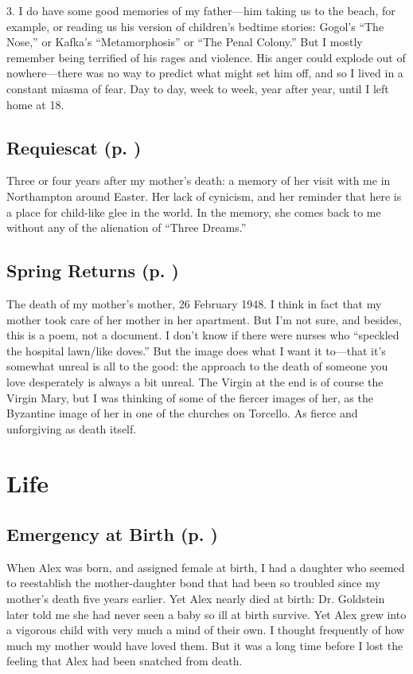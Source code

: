 3. I do have some good memories of my father---him taking us to the beach, for
example, or reading us his version of children's bedtime stories: Gogol's ``The
Nose,'' or Kafka's ``Metamorphosis'' or ``The Penal Colony.'' But I mostly
remember being terrified of his rages and violence. His anger could explode out
of nowhere---there was no way to predict what might set him off, and so I lived
in a constant miasma of fear. Day to day, week to week, year after year, until I
left home at 18.

\subsection*{Requiescat (p. \pageref{ch:requiescat})}
Three or four years after my mother's death: a memory of her visit with me in
Northampton around Easter. Her lack of cynicism, and her reminder that here is a
place for child-like glee in the world. In the memory, she comes back to me
without any of the alienation of ``Three Dreams.''

\subsection*{Spring Returns (p. \pageref{ch:springreturns})}
The death of my mother's mother, 26 February 1948. I think in fact that my
mother took care of her mother in her apartment. But I'm not sure, and besides,
this is a poem, not a document. I don't know if there were nurses who ``speckled
the hospital lawn/like doves.'' But the image does what I want it to---that it's
somewhat unreal is all to the good: the approach to the death of someone you
love desperately is always a bit unreal. The Virgin at the end is of course the
Virgin Mary, but I was thinking of some of the fiercer images of her, as the
Byzantine image of her in one of the churches on Torcello. As fierce and
unforgiving as death itself.

\section*{Life}

\subsection*{Emergency at Birth (p. \pageref{ch:emergency})}
When Alex was born, and assigned female at birth, I had a daughter who seemed to
reestablish the mother-daughter bond that had been so troubled since my mother's
death five years earlier. Yet Alex nearly died at birth: Dr. Goldstein later
told me she had never seen a baby so ill at birth survive. Yet Alex grew into a
vigorous child with very much a mind of their own. I thought frequently of how
much my mother would have loved them. But it was a long time before I lost the
feeling that Alex had been snatched from death.

